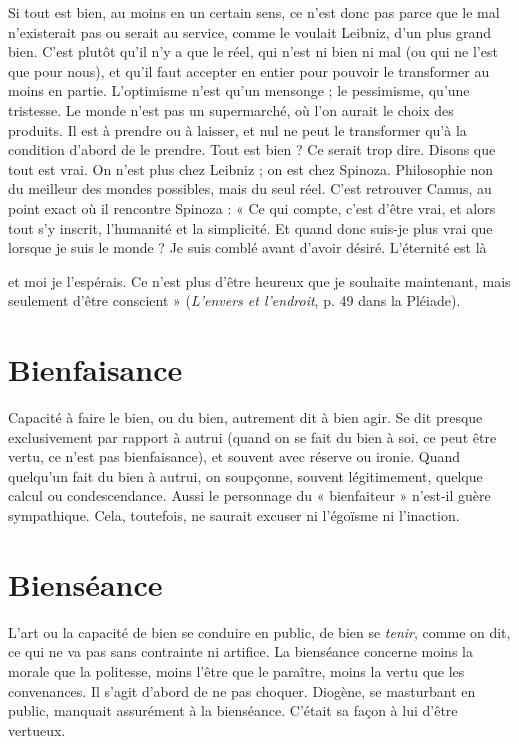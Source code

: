 Si tout est bien, au moins en un certain sens, ce n’est donc pas parce que le
mal n’existerait pas ou serait au service, comme le voulait Leibniz, d’un plus
grand bien. C’est plutôt qu’il n’y a que le réel, qui n’est ni bien ni mal (ou qui
ne l’est que pour nous), et qu’il faut accepter en entier pour pouvoir le transformer
au moins en partie. L’optimisme n’est qu’un mensonge ; le pessimisme,
qu’une tristesse. Le monde n’est pas un supermarché, où l’on aurait le choix des
produits. Il est à prendre ou à laisser, et nul ne peut le transformer qu’à la
condition d’abord de le prendre. Tout est bien ? Ce serait trop dire. Disons que
tout est vrai. On n’est plus chez Leibniz ; on est chez Spinoza. Philosophie non
du meilleur des mondes possibles, mais du seul réel. C’est retrouver Camus, au
point exact où il rencontre Spinoza : « Ce qui compte, c’est d’être vrai, et alors
tout s’y inscrit, l'humanité et la simplicité. Et quand donc suis-je plus vrai que
lorsque je suis le monde ? Je suis comblé avant d’avoir désiré. L’éternité est là

et moi je l’espérais. Ce n’est plus d’être heureux que je souhaite maintenant,
mais seulement d’être conscient » ({\it L'envers et l'endroit}, p. 49 dans la Pléiade).

\section{Bienfaisance}
Capacité à faire le bien, ou du bien, autrement dit à bien
agir. Se dit presque exclusivement par rapport à autrui
(quand on se fait du bien à soi, ce peut être vertu, ce n’est pas bienfaisance), et
souvent avec réserve ou ironie. Quand quelqu'un fait du bien à autrui, on
soupçonne, souvent légitimement, quelque calcul ou condescendance. Aussi le
personnage du « bienfaiteur » n’est-il guère sympathique. Cela, toutefois, ne
saurait excuser ni l’égoïsme ni l’inaction.

\section{Bienséance}
L’art ou la capacité de bien se conduire en public, de bien se
{\it tenir}, comme on dit, ce qui ne va pas sans contrainte ni artifice.
La bienséance concerne moins la morale que la politesse, moins l’être que
le paraître, moins la vertu que les convenances. Il s’agit d’abord de ne pas choquer.
Diogène, se masturbant en public, manquait assurément à la bienséance.
C'était sa façon à lui d’être vertueux.

